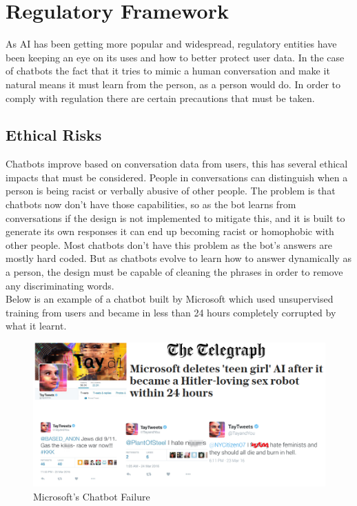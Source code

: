 \section{Regulatory Framework}\label{sec:chap2_reg_frame}

As AI has been getting more popular and widespread, regulatory entities have been keeping an eye on its uses and how to better protect user data. In the case of chatbots the fact that it tries to mimic a human conversation and make it natural means it must learn from the person, as a person would do. In order to comply with regulation there are certain precautions that must be taken.

\subsection{Ethical Risks}\label{sec:chap2_eth_rsks}


Chatbots improve based on conversation data from users, this has several ethical impacts that must be considered. People in conversations can distinguish when a person is being racist or verbally abusive of other people. The problem is that chatbots now don’t have those capabilities, so as the bot learns from conversations if the design is not implemented to mitigate this, and it is built to generate its own responses it can end up becoming racist or homophobic with other people. Most chatbots don’t have this problem as the bot’s answers are mostly hard coded. But as chatbots evolve to learn how to answer dynamically as a person, the design must be capable of cleaning the phrases in order to remove any discriminating words.\\

Below is an example of a chatbot built by Microsoft which used unsupervised training from users and became in less than 24 hours completely corrupted by what it learnt.\cite{micro-dis-bot}

\begin{center}
	\begin{figure}[h!]
		\centering
		\includegraphics[scale=0.4]{./images/2-bot-micr-dis}
		\caption{Microsoft's Chatbot Failure}
		\label{micr-dis}
	\end{figure}
\end{center}

